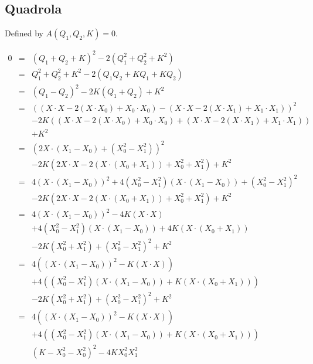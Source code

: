 \documentclass{article}
\begin{document}
\subsection{Quadrola}

Defined by $A(Q_1, Q_2, K) = 0$.

\begin{eqnarray}
0 & = & (Q_1 + Q_2 + K)^2 - 2(Q_1^2 + Q_2^2 + K^2)\\
  & = & Q_1^2 + Q_2^2 + K^2 - 2(Q_1Q_2 + KQ_1 + KQ_2)\\
  & = & (Q_1 - Q_2)^2 - 2K(Q_1 + Q_2) + K^2\\
  & = & ((X\cdot X - 2(X\cdot X_0) + X_0\cdot X_0) - (X\cdot X - 2(X\cdot X_1) + X_1\cdot X_1))^2 \nonumber\\
  &   & - 2K((X\cdot X - 2(X\cdot X_0) + X_0\cdot X_0) + (X\cdot X - 2(X\cdot X_1) + X_1\cdot X_1))\nonumber\\
  &   &  + K^2\\
  & = & (2X \cdot (X_1  - X_0) + (X_0^2 - X_1^2))^2 \nonumber\\
  &   & - 2K(2X\cdot X - 2(X\cdot (X_0 + X_1)) + X_0^2 + X_1^2) + K^2\\
  & = & 4(X\cdot(X_1 - X_0))^2 + 4(X_0^2 - X_1^2)(X\cdot(X_1 - X_0)) + (X_0^2 - X_1^2)^2\nonumber\\
  &   & - 2K(2X\cdot X - 2(X\cdot (X_0 + X_1)) + X_0^2 + X_1^2) + K^2\\
  & = & 4(X\cdot(X_1 - X_0))^2 -4K(X \cdot X)\nonumber\\
  &   &  + 4(X_0^2 - X_1^2)(X\cdot(X_1 - X_0)) + 4K(X\cdot (X_0 + X_1))\nonumber\\
  &   &  - 2K(X_0^2 + X_1^2) +(X_0^2 - X_1^2)^2 + K^2\\
  & = & 4((X\cdot(X_1 - X_0))^2 -K(X \cdot X))\nonumber\\
  &   &  + 4((X_0^2 - X_1^2)(X\cdot(X_1 - X_0)) + K(X\cdot (X_0 + X_1)))\nonumber\\
  &   &  - 2K(X_0^2 + X_1^2) +(X_0^2 - X_1^2)^2 + K^2\\
  & = & 4((X\cdot(X_1 - X_0))^2 -K(X \cdot X))\nonumber\\
  &   &  + 4((X_0^2 - X_1^2)(X\cdot(X_1 - X_0)) + K(X\cdot (X_0 + X_1)))\nonumber\\
  &   &  (K - X_0^2 - X_0^2)^2 - 4KX_0^2X_1^2
\end{eqnarray}
\end{document}
